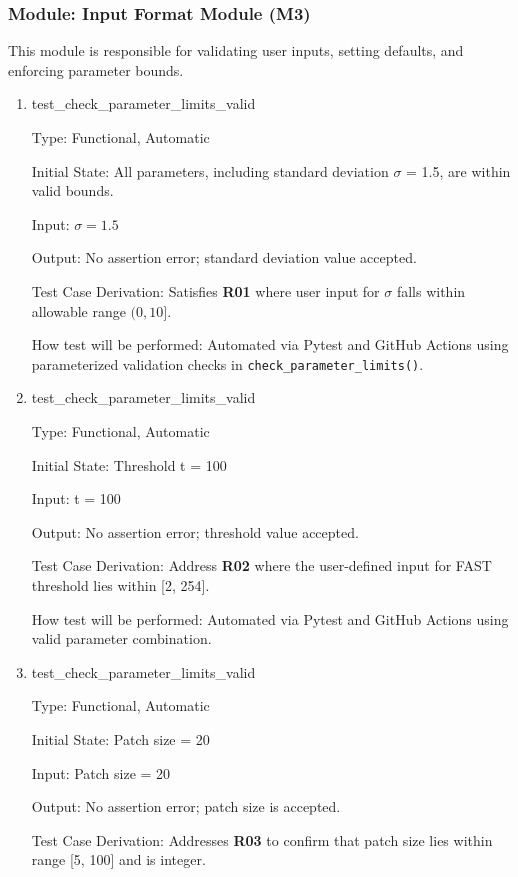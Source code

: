 \documentclass[12pt, titlepage]{article}
\begin{document}
\subsubsection{Module: Input Format Module (M3)}

This module is responsible for validating user inputs, setting defaults, and enforcing parameter bounds.

\begin{enumerate}
\item{test\_check\_parameter\_limits\_valid\\}

Type: Functional, Automatic
          
Initial State: All parameters, including standard deviation $\sigma$ = 1.5, are within valid bounds.

Input: $\sigma = 1.5$

Output: No assertion error; standard deviation value accepted.

Test Case Derivation: Satisfies \textbf{R01} where user input for $\sigma$  falls within allowable range $(0, 10]$.

How test will be performed: Automated via Pytest and GitHub Actions using parameterized validation checks in \texttt{check\_parameter\_limits()}.

\item{test\_check\_parameter\_limits\_valid\\}

Type: Functional, Automatic

Initial State: Threshold t = 100

Input: t = 100

Output: No assertion error; threshold value accepted.

Test Case Derivation: Address \textbf{R02} where the user-defined input for FAST threshold lies within [2, 254].

How test will be performed: Automated via Pytest and GitHub Actions using valid parameter combination.

\item{test\_check\_parameter\_limits\_valid\\}

Type: Functional, Automatic

Initial State: Patch size = 20

Input: Patch size = 20

Output: No assertion error; patch size is accepted.

Test Case Derivation: Addresses \textbf{R03} to confirm that patch size lies within range [5, 100] and is integer.


\end{enumerate}
\end{document}
